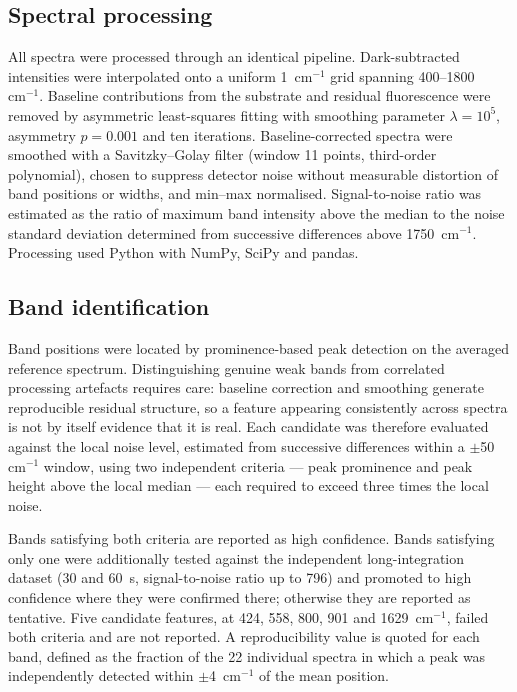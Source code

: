 \documentclass[preprint,12pt]{elsarticle}
\newcommand{\wn}{\ensuremath{\mathrm{cm}^{-1}}}
\begin{document}
\subsection{Spectral processing}

All spectra were processed through an identical pipeline. Dark-subtracted
intensities were interpolated onto a uniform 1~\wn{} grid spanning
400--1800~\wn{}. Baseline contributions from the substrate and residual
fluorescence were removed by asymmetric least-squares fitting \cite{eilers2005}
with smoothing parameter $\lambda = 10^{5}$, asymmetry $p = 0.001$ and ten
iterations. Baseline-corrected spectra were smoothed with a Savitzky--Golay
filter \cite{savitzky1964} (window 11 points, third-order polynomial), chosen to
suppress detector noise without measurable distortion of band positions or
widths, and min--max normalised. Signal-to-noise ratio was estimated as the
ratio of maximum band intensity above the median to the noise standard deviation
determined from successive differences above 1750~\wn{}. Processing used Python
with NumPy, SciPy and pandas.

\subsection{Band identification}

Band positions were located by prominence-based peak detection on the averaged
reference spectrum. Distinguishing genuine weak bands from correlated processing
artefacts requires care: baseline correction and smoothing generate reproducible
residual structure, so a feature appearing consistently across spectra is not by
itself evidence that it is real. Each candidate was therefore evaluated against
the local noise level, estimated from successive differences within a
$\pm$50~\wn{} window, using two independent criteria --- peak prominence and
peak height above the local median --- each required to exceed three times the
local noise.

Bands satisfying both criteria are reported as high confidence. Bands satisfying
only one were additionally tested against the independent long-integration
dataset (30 and 60~s, signal-to-noise ratio up to 796) and promoted to high
confidence where they were confirmed there; otherwise they are reported as
tentative. Five candidate features, at 424, 558, 800, 901 and 1629~\wn{}, failed
both criteria and are not reported. A reproducibility value is quoted for each
band, defined as the fraction of the 22 individual spectra in which a peak was
independently detected within $\pm$4~\wn{} of the mean position.
\end{document}
